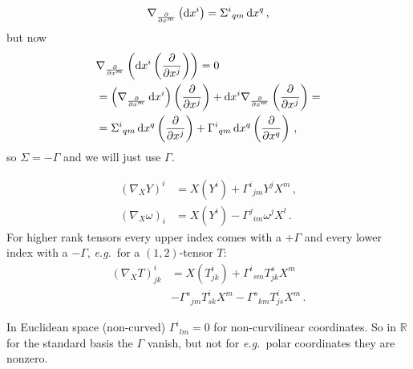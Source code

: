 \documentclass[11pt, a4paper, twocolumn]{article} %
\begin{document}
    \begin{equation}
        \nabla_{\frac{\partial}{\partial x^m}}\left( \operatorname{d\!} x^i \right) = \Sigma^{i}{}_{qm}\operatorname{d\!} x^q\,,
    \end{equation}
    but now
    \begin{align*}
        &\nabla_{\frac{\partial}{\partial x^m}}\left( \operatorname{d\!} x^i \left( \frac{\partial}{\partial x^j} \right) \right) = 0\\
        &=\left(\nabla_{\frac{\partial}{\partial x^m}}\operatorname{d\!} x^i\right)\left(\frac{\partial}{\partial x^j}\right) +
            \operatorname{d\!} x^i \nabla_{\frac{\partial}{\partial x^m}}\left( \frac{\partial}{\partial x^j} \right)=\\
            &= \Sigma^{i}{}_{qm}\operatorname{d\!} x^q \left( \frac{\partial}{\partial x^j} \right) +
            \Gamma^{i}{}_{qm}\operatorname{d\!} x^q \left( \frac{\partial}{\partial x^q} \right)\,,
    \end{align*}
    so $\Sigma = - \Gamma$ and we will just use $\Gamma$.
    \begin{center}
    \end{center}
    \begin{align}
        \left( \nabla_X Y \right)^i &= X(Y^i) + \Gamma^{i}{}_{jm}Y^j X^m\,,\\
        \left( \nabla_X \omega \right)_i &= X(Y^i) - \Gamma^{j}{}_{im}\omega^j X^l\,.
    \end{align}
    For higher rank tensors every upper index comes with a $+\Gamma$ and every lower index with a $-\Gamma$,
    \textit{e.g.}\ for a $(1,2)$-tensor $T$:
    \begin{align}
        \nonumber (\nabla_X T)^i_{jk} &= X(T^i_{jk}) + \Gamma^i{}_{sm}T^s_{jk}X^m \\
        &- \Gamma^s{}_{jm}T^i_{sk}X^m - \Gamma^s{}_{km}T^i_{js}X^m\,.
    \end{align}
    \begin{note}
        In Euclidean space (non-curved) $\Gamma^i{}_{lm} = 0$ for non-curvilinear coordinates.
        So in $\mathbb{R}$ for the standard basis the $\Gamma$ vanish, but not for \textit{e.g.}\ 
        polar coordinates they are nonzero.
    \end{note}
    \begin{defn}[Gradient]
        
    \end{defn}
\end{document}
